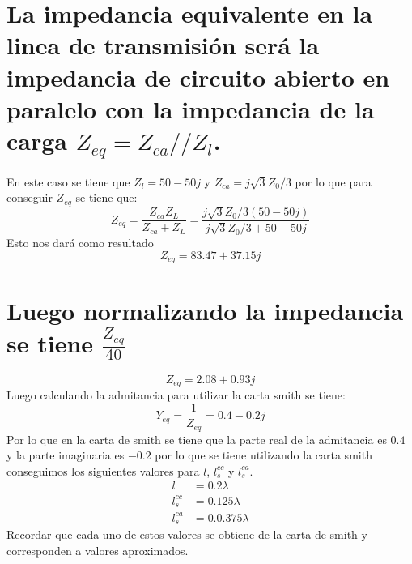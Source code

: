 \documentclass[
  11pt,
  letterpaper,
  answers
]{exam}
\begin{document}
\begin{questions}
\begin{solution}
\begin{parts}
\part{La impedancia equivalente en la linea de transmisión será la impedancia de circuito abierto en paralelo con la impedancia de la carga $Z_{eq} = Z_{ca}//Z_{l}$.}
En este caso se tiene que $Z_{l} = 50-50j$ y $Z_{ca} = j \sqrt{3}Z_{0}/3$ por lo que para conseguir $Z_{eq}$ se tiene que:
\begin{equation}
  Z_{eq} = \frac{Z_{ca}Z_{L}}{Z_{ca}+Z_{L}} = \frac{j \sqrt{3}Z_{0}/3(50-50j)}{j \sqrt{3}Z_{0}/3+50-50j}
\end{equation}
Esto nos dará como resultado
\begin{equation}
  Z_{eq} = 83.47 + 37.15j
\end{equation}
\part{Luego normalizando la impedancia se tiene $\frac{Z_{eq}}{40}$}
\begin{equation}
  Z_{eq} = 2.08 + 0.93j
\end{equation}
Luego calculando la admitancia para utilizar la carta smith se tiene:
\begin{equation}
  Y_{eq} = \frac{1}{Z_{eq}} = 0.4 - 0.2j
\end{equation}
Por lo que en la carta de smith se tiene que la parte real de la admitancia es $0.4$ y la parte imaginaria es $-0.2$ por lo que se tiene utilizando la carta smith conseguimos los siguientes valores para $l$, $l_s^{cc}$ y $l_s^{ca}$.
\begin{align}
  l &= 0.2\lambda\\
  l_s^{cc} &= 0.125\lambda\\
  l_s^{ca} &= 0.0.375\lambda
\end{align}
Recordar que cada uno de estos valores se obtiene de la carta de smith y corresponden a valores aproximados.






\end{parts}
\end{solution}


\end{questions}
\end{document}
